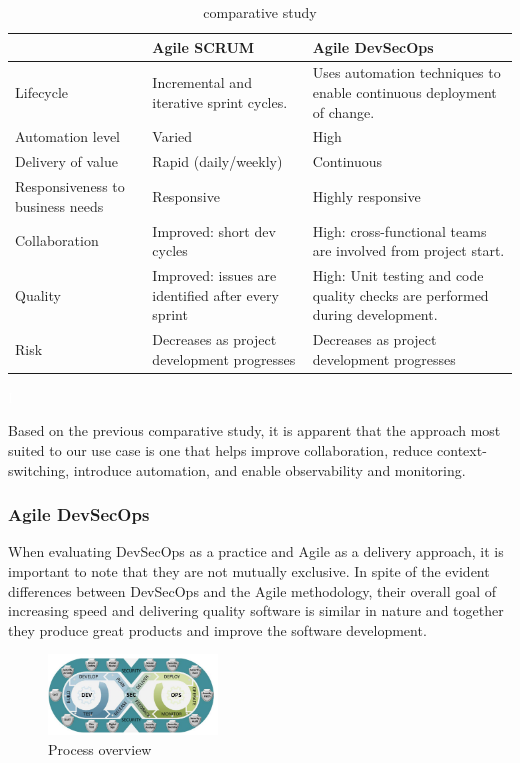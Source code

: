 \begin{table}[h!]
\center
\begin{tabular}[b]{|m{4cm}|m{5cm}|m{5cm}|}
\hline
\rowcolor{white}
 &  Agile SCRUM   & Agile DevSecOps  \\
\hline
 Lifecycle  
& Incremental and iterative sprint cycles. 
& Uses automation techniques to enable continuous deployment of change. \\
\hline
 Automation level  
&  Varied 
& High 
 \\
\hline
 Delivery of value 
&  Rapid (daily/weekly) 
& Continuous  \\
\hline
 Responsiveness to business needs 
&  Responsive 
& Highly responsive   \\
\hline
 Collaboration 
& Improved: short dev cycles 
& High: cross-functional teams are involved from project start. \\
\hline
Quality 
& Improved: issues are identified after every sprint 
& High: Unit testing and code quality checks are performed during development. \\
\hline
 Risk 
&  Decreases as project development progresses 
& Decreases as project development progresses \\
\hline
\end{tabular}
\caption{ comparative study}
\textcolor{white}{I} \label{tab:tab-m}
\end{table}

\hspace{7mm}Based on the previous comparative study, it is apparent that the approach most suited to our use case is one that helps improve collaboration, reduce context-switching, introduce automation, and enable observability and monitoring.

\subsubsection{Agile DevSecOps }

\hspace{7mm}When evaluating DevSecOps as a practice and Agile as a delivery approach, it is important to note that they are not mutually exclusive. In spite of the evident differences between DevSecOps and the Agile methodology, their overall goal of increasing speed and delivering quality software is similar in nature and together they produce great products and improve the software development.

\begin{figure}[!ht]\centering
\includegraphics[width=0.4\textwidth,angle=00]{assets/f1.png}
\caption{Process overview}
\label{fig:processOverview}
\end{figure}

